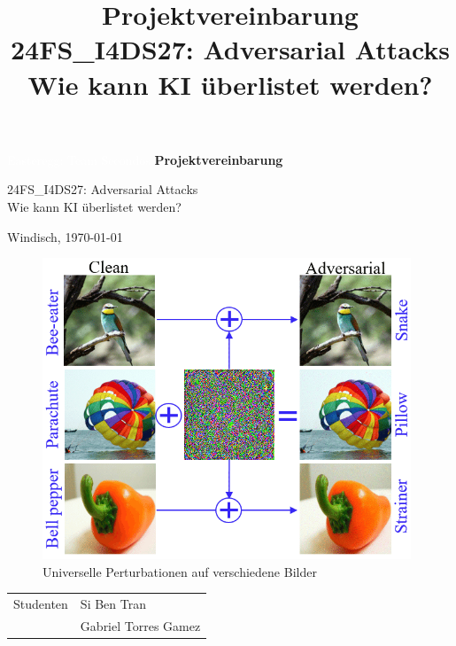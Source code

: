 \title{\textbf{Projektvereinbarung}\break \\ 24FS\_I4DS27: Adversarial Attacks \\ Wie kann KI überlistet werden?} %

\begin{titlepage}
    \textcolor{white}{Easteregg: Team Secondos}
    \vfill
    \centering
    \vspace{0.5cm}
    \huge{\textbf{Projektvereinbarung}}
    
    \vspace{0.5cm}
    \huge{24FS\_I4DS27: Adversarial Attacks \\ Wie kann KI überlistet werden?}
    \vspace{0.5cm}
    
    \Large{Windisch, \germandate\today}      

    \vfill
    
    \begin{figure}[H]
        \centering
        \includegraphics[width=11cm]{01-images/01-titleimage.png}
        \caption{Universelle Perturbationen auf verschiedene Bilder \cite{akhtar_advances_2021}}
        \label{01-titleimage}
    \end{figure}
    
    \vfill

    \large{
    \begin{tabular}{@{}p{7cm}l}
        Studenten                  &    Si Ben Tran\\
                                   &    Gabriel Torres Gamez\\[2ex]
        

\end{tabular}}
\end{titlepage}
